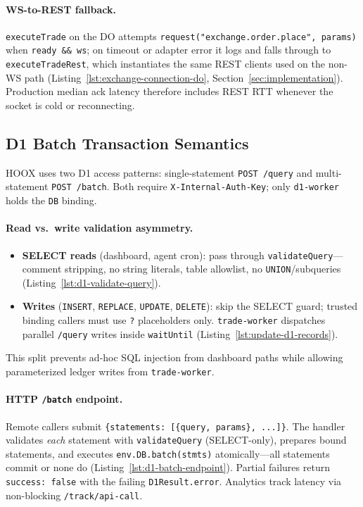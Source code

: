 
\paragraph{WS-to-REST fallback.} \texttt{executeTrade} on the DO attempts \texttt{request("exchange.order.place", params)} when \texttt{ready \&\& ws}; on timeout or adapter error it logs and falls through to \texttt{executeTradeRest}, which instantiates the same REST clients used on the non-WS path (Listing~\ref{lst:exchange-connection-do}, Section~\ref{sec:implementation}). Production median ack latency therefore includes REST RTT whenever the socket is cold or reconnecting.

\subsection{D1 Batch Transaction Semantics}

\textsc{HOOX} uses two D1 access patterns: single-statement \texttt{POST /query} and multi-statement \texttt{POST /batch}. Both require \texttt{X-Internal-Auth-Key}; only \texttt{d1-worker} holds the \texttt{DB} binding.

\paragraph{Read vs.\ write validation asymmetry.}
\begin{itemize}
  \item \textbf{SELECT reads} (dashboard, agent cron): pass through \texttt{validateQuery}---comment stripping, no string literals, table allowlist, no \texttt{UNION}/subqueries (Listing~\ref{lst:d1-validate-query}).
  \item \textbf{Writes} (\texttt{INSERT}, \texttt{REPLACE}, \texttt{UPDATE}, \texttt{DELETE}): skip the SELECT guard; trusted binding callers must use \texttt{?} placeholders only. \texttt{trade-worker} dispatches parallel \texttt{/query} writes inside \texttt{waitUntil} (Listing~\ref{lst:update-d1-records}).
\end{itemize}

This split prevents ad-hoc SQL injection from dashboard paths while allowing parameterized ledger writes from \texttt{trade-worker}.

\paragraph{HTTP \texttt{/batch} endpoint.} Remote callers submit \texttt{\{statements: [\{query, params\}, ...]\}}. The handler validates \emph{each} statement with \texttt{validateQuery} (SELECT-only), prepares bound statements, and executes \texttt{env.DB.batch(stmts)} atomically---all statements commit or none do (Listing~\ref{lst:d1-batch-endpoint}). Partial failures return \texttt{success: false} with the failing \texttt{D1Result.error}. Analytics track latency via non-blocking \texttt{/track/api-call}.

